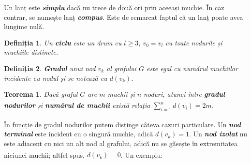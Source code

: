 \documentclass[9pt,a4paper]{report}
\newtheorem{definitie}{Definiția}
\newtheorem{teorema}{Teorema}
\begin{document}
Un lanț este \textbf{\textit{simplu}} dacă nu trece de două ori prin aceeași muchie. În caz contrar, se numește lanț \textbf{\textit{compus}}. Este de remarcat faptul că un lanț poate avea lungime nulă.

\begin{definitie}
    Un \textbf{ciclu} este un drum cu $l \geq 3$, $v_0 = v_l$ cu toate nodurile și muchiile distincte.
\end{definitie}

\begin{definitie}
    \textbf{Gradul} unui nod $v_k$ al grafului $G$ este egal cu numărul muchiilor incidente cu nodul și se notează cu $d(v_k)$.
\end{definitie}

\begin{teorema}
    Dacă graful $G$ are $m$ muchii și $n$ noduri, atunci între \textbf{gradul nodurilor} și \textbf{numărul de muchii} există relația\textsuperscript{\cite{milosescu}} $\sum_{i=1}^n d(v_i) = 2m$.
\end{teorema}

În funcție de gradul nodurilor putem distinge câteva cazuri particulare\textsuperscript{\cite{milosescu}}. Un \textbf{\textit{nod terminal}} este incident cu o singură muchie, adică $d(v_k) = 1$. Un \textbf{\textit{nod izolat}} nu este adiacent cu nici un alt nod al grafului, adică nu se găsește în extremitatea niciunei muchii; altfel spus, $d(v_k) = 0$. Un exemplu\textsuperscript{\cite{milosescu}}:
\end{document}
